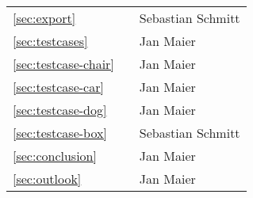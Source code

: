 \begin{tabularx}{\textwidth}{lXl}
\autoref{sec:export} & \nameref{sec:export}       & Sebastian Schmitt       \\
\autoref{sec:testcases} & \nameref{sec:testcases}       & Jan Maier       \\
\autoref{sec:testcase-chair} & \nameref{sec:testcase-chair}       & Jan Maier       \\
\autoref{sec:testcase-car} & \nameref{sec:testcase-car}       & Jan Maier       \\
\autoref{sec:testcase-dog} & \nameref{sec:testcase-dog}       & Jan Maier       \\
\autoref{sec:testcase-box} & \nameref{sec:testcase-box}       & Sebastian Schmitt       \\
\autoref{sec:conclusion} & \nameref{sec:conclusion}       & Jan Maier       \\
\autoref{sec:outlook} & \nameref{sec:outlook}       & Jan Maier 
\end{tabularx}